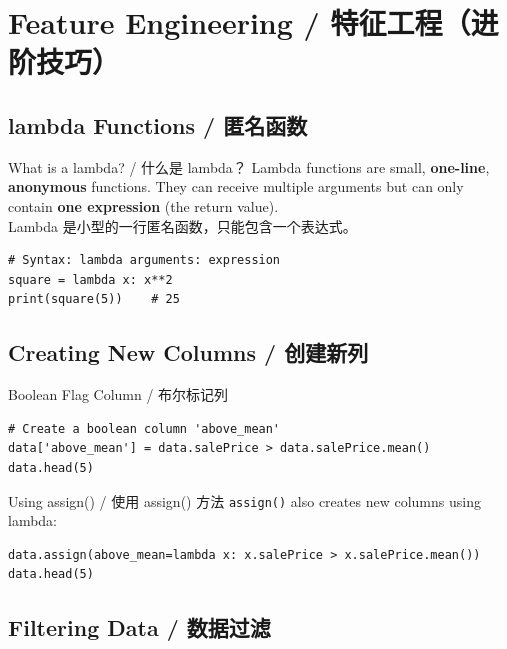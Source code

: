 \documentclass[11pt,a4paper]{article}
\begin{document}
\section{Feature Engineering / 特征工程（进阶技巧）}

\subsection{lambda Functions / 匿名函数}

\begin{concept}{What is a lambda? / 什么是 lambda？}
    Lambda functions are small, \textbf{one-line}, \textbf{anonymous} functions. They can receive multiple arguments but can only contain \textbf{one expression} (the return value). \\
    Lambda 是小型的一行匿名函数，只能包含一个表达式。

    \begin{lstlisting}
# Syntax: lambda arguments: expression
square = lambda x: x**2
print(square(5))    # 25
    \end{lstlisting}
\end{concept}

\subsection{Creating New Columns / 创建新列}

\begin{examplebox}{Boolean Flag Column / 布尔标记列}
\begin{lstlisting}
# Create a boolean column 'above_mean'
data['above_mean'] = data.salePrice > data.salePrice.mean()
data.head(5)
\end{lstlisting}
\end{examplebox}

\begin{examplebox}{Using assign() / 使用 assign() 方法}
    \texttt{assign()} also creates new columns using lambda:
\begin{lstlisting}
data.assign(above_mean=lambda x: x.salePrice > x.salePrice.mean())
data.head(5)
\end{lstlisting}
\end{examplebox}

\subsection{Filtering Data / 数据过滤}
\end{document}
